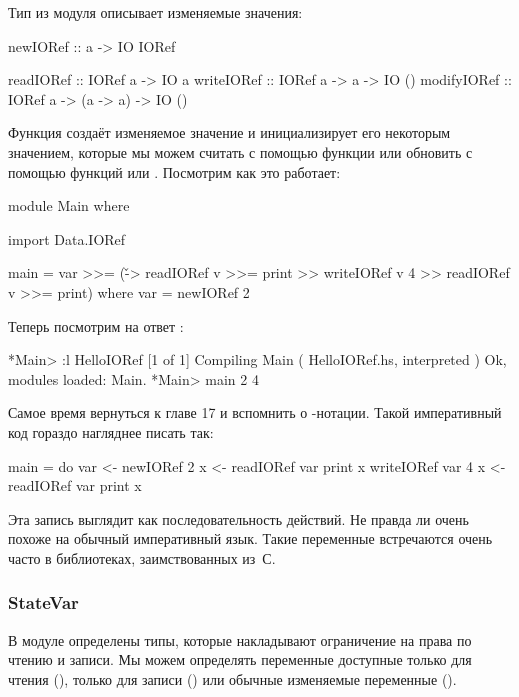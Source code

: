 Тип  из модуля  
описывает изменяемые значения:

\begin{code}
newIORef :: a -> IO IORef

readIORef   :: IORef a -> IO a
writeIORef  :: IORef a -> a -> IO ()
modifyIORef :: IORef a -> (a -> a) -> IO ()
\end{code}

Функция  создаёт изменяемое значение
и инициализирует его некоторым значением, которые
мы можем считать с помощью функции  
или обновить с помощью функций 
или . Посмотрим как это работает:

\begin{code}
module Main where

import Data.IORef

main = var >>= (\v -> 
       readIORef v >>= print 
    >> writeIORef v 4 
    >> readIORef v >>= print)
    where var = newIORef 2    
\end{code}

Теперь посмотрим на ответ :

\begin{code}
*Main> :l HelloIORef
[1 of 1] Compiling Main             ( HelloIORef.hs, interpreted )
Ok, modules loaded: Main.
*Main> main
2
4
\end{code}

Самое время вернуться к главе 17 и вспомнить о -нотации.
Такой императивный код гораздо нагляднее писать так:

\begin{code}
main = do
    var <- newIORef 2
    x <- readIORef var
    print x
    writeIORef var 4
    x <- readIORef var
    print x
\end{code}

Эта запись выглядит как последовательность действий. 
Не правда ли очень похоже на обычный императивный язык.
Такие переменные встречаются очень часто в библиотеках,
заимствованных из~С. 

\subsubsection{StateVar}

В модуле  определены типы, которые
накладывают ограничение на права по чтению и записи.
Мы можем определять переменные доступные 
только для чтения (), 
только для записи () или 
обычные изменяемые переменные ().

